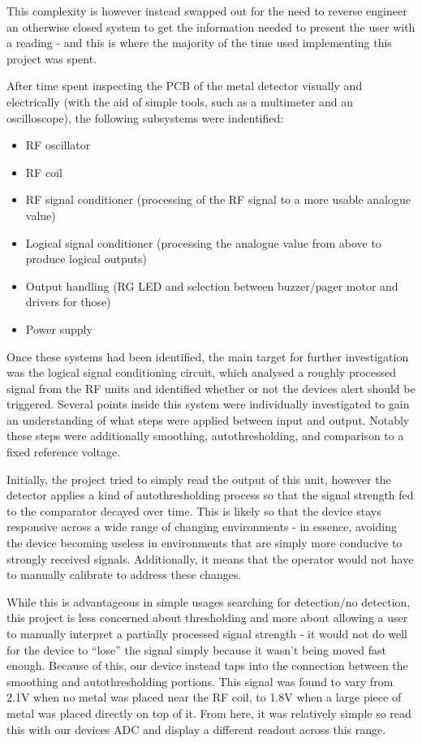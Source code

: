 \documentclass[a4paper]{article}
\begin{document}
        This complexity is however instead swapped out for the need to reverse engineer an otherwise closed system to get the information needed to present the user with a reading - and this is where the majority of the time used implementing this project was spent.

        After time spent inspecting the PCB of the metal detector visually and electrically (with the aid of simple tools, such as a multimeter and an oscilloscope), the following subsystems were indentified:
        \begin{itemize}
            \item RF oscillator
            \item RF coil
            \item RF signal conditioner (processing of the RF signal to a more usable analogue value)
            \item Logical signal conditioner (processing the analogue value from above to produce logical outputs)
            \item Output handling (RG LED and selection between buzzer/pager motor and drivers for those)
            \item Power supply
        \end{itemize}

        Once these systems had been identified, the main target for further investigation was the logical signal conditioning circuit, which analysed a roughly processed signal from the RF units and identified whether or not the devices alert should be triggered.
        Several points inside this system were individually investigated to gain an understanding of what steps were applied between input and output. Notably these steps were additionally smoothing, autothresholding, and comparison to a fixed reference voltage.
        
        Initially, the project tried to simply read the output of this unit, however the detector applies a kind of autothresholding process so that the signal strength fed to the comparator decayed over time.
        This is likely so that the device stays responsive across a wide range of changing environments - in essence, avoiding the device becoming useless in environments that are simply more conducive to strongly received signals.
        Additionally, it means that the operator would not have to manually calibrate to address these changes.

        While this is advantageous in simple usages searching for detection/no detection, this project is less concerned about thresholding and more about allowing a user to manually interpret a partially processed signal strength - it would not do well for the device to ``lose'' the signal simply because it wasn't being moved fast enough.
        Because of this, our device instead taps into the connection between the smoothing and autothresholding portions. This signal was found to vary from 2.1V when no metal was placed near the RF coil, to 1.8V when a large piece of metal was placed directly on top of it.
        From here, it was relatively simple so read this with our devices ADC and display a different readout across this range.
\end{document}
